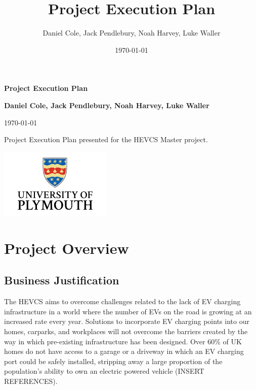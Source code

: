 \documentclass [12pt]{article}
\title{Project Execution Plan}
\author{Daniel Cole, Jack Pendlebury, Noah Harvey, Luke Waller}
\date{\today}
\begin{document}
\begin{titlepage}
    \begin{center}
        \vspace*{1cm}

        {\Huge \textbf{Project Execution Plan}}

        \vspace{1.5cm}

        \textbf{Daniel Cole, Jack Pendlebury, Noah Harvey, Luke Waller}

        \today

        \vfill

        Project Execution Plan presented for the HEVCS Master project.

        \vspace{0.8cm}

        \includegraphics[width=0.4\textwidth]{UOP_Logo.png}

    \end{center}
\end{titlepage}

\newpage
{}
\setcounter{page}{1}
\tableofcontents
\newpage

\newpage
\section{Project Overview}\label{sec:section_1}
\subsection{Business Justification}\label{sec:business_justification}
The HEVCS aims to overcome challenges related to the lack of EV charging infrastructure in a world where the number of EVs on the road is growing at an increased rate every year. Solutions to incorporate EV charging points into our homes, carparks, and workplaces will not overcome the barriers created by the way in which pre-existing infrastructure has been designed. Over 60\% of UK homes do not have access to a garage or a driveway in which an EV charging port could be safely installed, stripping away a large proportion of the population’s ability to own an electric powered vehicle (INSERT REFERENCES).
\end{document}
